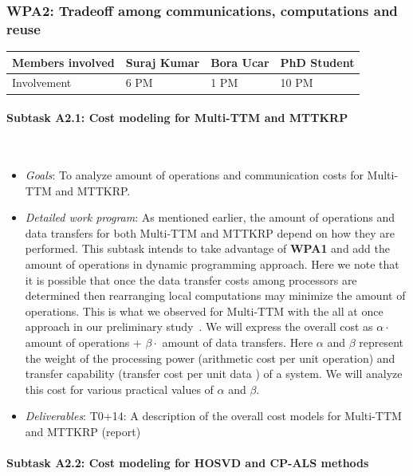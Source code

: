 \documentclass[a4paper,11pt]{article}
\newcommand{\subtask}[1]{{\color{orange}\paragraph{#1}$ $}}
\newcommand{\goal}{{\color{orange2}  \emph{Goals}:} }
\newcommand{\dwp}{{\color{orange2}  \emph{Detailed work program}: }}
\newcommand{\deliverables}{{\color{orange2}  \emph{Deliverables}: }}
\begin{document}
	\subsubsection{\textbf{WPA2}: Tradeoff among communications, computations and reuse}
	\begin{table}[H]
		\begin{tabular}{llll}
			\hline
			\cellcolor{blue2}
			Members involved & Suraj Kumar& Bora Ucar & PhD Student \\
			\hline
			\cellcolor{orange2}
			Involvement      & 6 PM            & 1 PM & 10 PM \\
			\hline
		\end{tabular}
	\end{table}
	\subtask{Subtask A2.1: Cost modeling for Multi-TTM and MTTKRP}
	\begin{itemize}[leftmargin=-1pt]
		\item[] \goal To analyze amount of operations and communication costs for Multi-TTM and MTTKRP. 
		\item[] \dwp As mentioned earlier, the amount of operations and data transfers for both Multi-TTM and MTTKRP depend on how they are performed. This subtask intends to take advantage of \textbf{WPA1} and add the amount of operations in dynamic programming approach. Here we note that it is possible that once the data transfer costs among processors are determined then rearranging local computations may minimize the amount of operations. This is what we observed for Multi-TTM with the all at once approach in our preliminary study~\cite{ABGKR-SIMAX-2024}. We will express the overall cost as $\alpha\cdot$ amount of operations + $\beta\cdot$ amount of data transfers. Here $\alpha$ and $\beta$ represent the weight of the processing power (arithmetic cost per unit operation) and transfer capability (transfer cost per unit data ) of a system. We will analyze this cost for various practical values of $\alpha$ and $\beta$.
		\item[] \deliverables T0+14: A description of the overall cost models for Multi-TTM and MTTKRP (report)
	\end{itemize}
	\subtask{Subtask A2.2: Cost modeling for HOSVD and CP-ALS methods}
\end{document}
